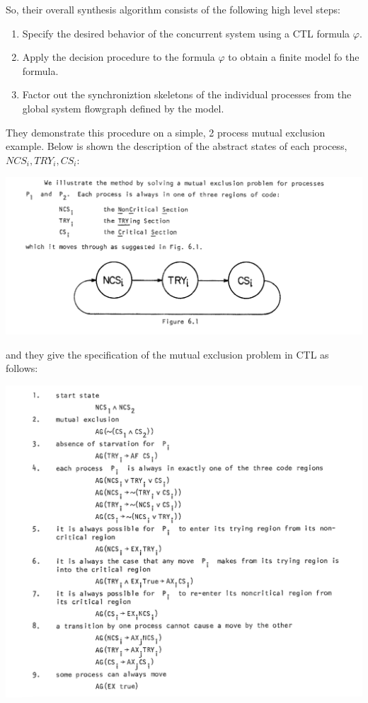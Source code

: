 \documentclass[10pt,a4paper]{article}
\begin{document}
So, their overall synthesis algorithm consists of the following high level steps:
\begin{enumerate}
    \item Specify the desired behavior of the concurrent system using a CTL formula $\varphi$.
    \item Apply the decision procedure to the formula $\varphi$ to obtain a finite model fo the formula.
    \item Factor out the synchroniztion skeletons of the individual processes from the global system flowgraph defined by the model.
\end{enumerate}
They demonstrate this procedure on a simple, 2 process mutual exclusion example. Below is shown the description of the abstract states of each process, $NCS_i, TRY_i, CS_i$: 
\begin{center}
    \includegraphics[scale=0.4]{images/mutex_processes.png}
\end{center}
and they give the specification of the mutual exclusion problem in CTL as follows:
\begin{center}
    \includegraphics[scale=0.3]{images/mutex_spec.png}
\end{center}

% 
 

\end{document}
